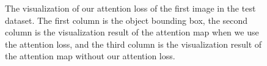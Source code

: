 \begin{figure}[H]
{\begin{minipage}[t]{5cm}
	\end{minipage}}
	
	\caption[The visualization of our attention loss of the first image in the test dataset]{The visualization of our attention loss of the first image in the test dataset. The first column is the object bounding box, the second column is the visualization result of the attention map when we use the attention loss, and the third column is the visualization result of the attention map without our attention loss.}
	\label{fig:train_attention_loss}
\end{figure}




